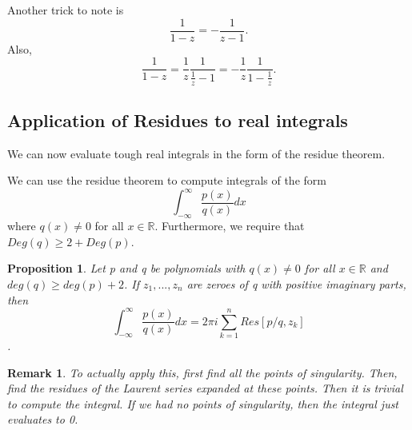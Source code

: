 \documentclass[twoside]{article}
\newtheorem{proposition}[theorem]{Proposition}
\newtheorem{remark}[theorem]{Remark}
\begin{document}
Another trick to note is 
$$
\frac{1}{1 - z} = -\frac{1}{z - 1}.
$$
Also, 
$$
\frac{1}{1 - z} = \frac{1}{z}\frac{1}{\frac{1}{z} - 1} = -\frac{1}{z}\frac{1}{1 - \frac{1}{z}}.
$$

\bigskip

\subsection{Application of Residues to real integrals}

We can now evaluate tough real integrals in the form of the residue theorem.

We can use the residue theorem to compute integrals of the form
$$
\int_{-\infty}^{\infty}\frac{p(x)}{q(x)}dx
$$
where $q(x) \neq 0$ for all $x \in \mathbb{R}$. Furthermore, we require that $Deg(q) \geq 2 + Deg(p)$.

\begin{proposition} Let p and q be polynomials with $q(x) \neq 0$ for all $x \in \mathbb{R}$ and $deg(q) \geq deg(p) + 2$. If $z_1, ...,z_n$ are zeroes of q with positive imaginary parts, then
$$
\int_{-\infty}^{\infty}\frac{p(x)}{q(x)}dx = 2\pi i \sum_{k=1}^n
Res[p/q, z_k]$$.
\end{proposition}

\begin{remark} To actually apply this, first find all the points of singularity. Then, find the residues of the Laurent series expanded at these points. Then it is trivial to compute the integral. If we had no points of singularity, then the integral just evaluates to 0.
\end{remark}
\end{document}
